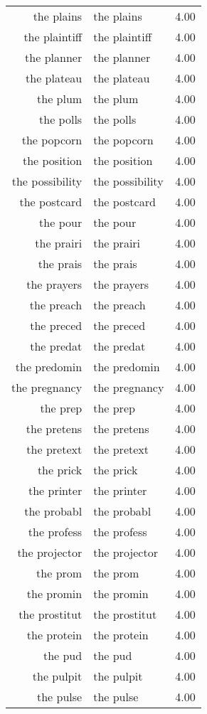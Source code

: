 \begin{table}[ht]
\begin{tabular}{rlr}
  the plains & the plains & 4.00 \\ 
  the plaintiff & the plaintiff & 4.00 \\ 
  the planner & the planner & 4.00 \\ 
  the plateau & the plateau & 4.00 \\ 
  the plum & the plum & 4.00 \\ 
  the polls & the polls & 4.00 \\ 
  the popcorn & the popcorn & 4.00 \\ 
  the position & the position & 4.00 \\ 
  the possibility & the possibility & 4.00 \\ 
  the postcard & the postcard & 4.00 \\ 
  the pour & the pour & 4.00 \\ 
  the prairi & the prairi & 4.00 \\ 
  the prais & the prais & 4.00 \\ 
  the prayers & the prayers & 4.00 \\ 
  the preach & the preach & 4.00 \\ 
  the preced & the preced & 4.00 \\ 
  the predat & the predat & 4.00 \\ 
  the predomin & the predomin & 4.00 \\ 
  the pregnancy & the pregnancy & 4.00 \\ 
  the prep & the prep & 4.00 \\ 
  the pretens & the pretens & 4.00 \\ 
  the pretext & the pretext & 4.00 \\ 
  the prick & the prick & 4.00 \\ 
  the printer & the printer & 4.00 \\ 
  the probabl & the probabl & 4.00 \\ 
  the profess & the profess & 4.00 \\ 
  the projector & the projector & 4.00 \\ 
  the prom & the prom & 4.00 \\ 
  the promin & the promin & 4.00 \\ 
  the prostitut & the prostitut & 4.00 \\ 
  the protein & the protein & 4.00 \\ 
  the pud & the pud & 4.00 \\ 
  the pulpit & the pulpit & 4.00 \\ 
  the pulse & the pulse & 4.00 \\ 

\end{tabular}
\end{table}
